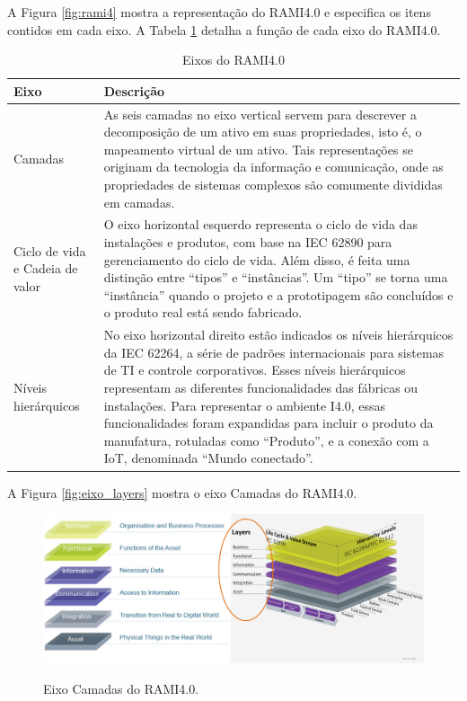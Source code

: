 \documentclass[
	12pt,				%
	oneside,			%
	a4paper,			%
	english,			%
	brazil				%
]{abntex2}
\begin{document}
	A Figura \ref{fig:rami4} mostra a representação do RAMI4.0 e especifica os itens contidos em cada eixo. A Tabela \ref{tab:rami-eixos} detalha a função de cada eixo do RAMI4.0.
	
	\begin{table}[H]
		\centering
		\caption{Eixos do RAMI4.0}
		\begin{tabular}{|p{1.3in}|p{4in}|}
			
			\hline
			\textbf{Eixo}
			&\textbf{Descrição} \\
			
			\hline
			Camadas
			& As seis camadas no eixo vertical servem para descrever a decomposição de um ativo em suas propriedades, isto é, o mapeamento virtual de um ativo. Tais representações se originam da tecnologia da informação e comunicação, onde as propriedades de sistemas complexos são comumente divididas em camadas. \\
			
			
			\hline
			Ciclo de vida e  Cadeia de valor
			& O eixo horizontal esquerdo representa o ciclo de vida das instalações e produtos, com base na IEC 62890 para gerenciamento do ciclo de vida. Além disso, é feita uma distinção entre ``tipos'' e ``instâncias''. Um ``tipo'' se torna uma ``instância'' quando o projeto e a prototipagem são concluídos e o produto real está sendo fabricado. \\
			
			\hline
			Níveis hierárquicos
			& No eixo horizontal direito estão indicados os níveis hierárquicos da IEC 62264, a série de padrões internacionais para sistemas de TI e controle corporativos. Esses níveis hierárquicos representam as diferentes funcionalidades das fábricas ou instalações. Para representar o ambiente I4.0, essas funcionalidades foram expandidas para incluir o produto da manufatura, rotuladas como ``Produto'', e a conexão com a IoT, denominada ``Mundo conectado''. \\
			\hline
			
		\end{tabular}
		\label{tab:rami-eixos}
	\end{table}

	A Figura \ref{fig:eixo_layers} mostra o eixo Camadas do RAMI4.0.
	
	\begin{figure}[H]
		\centering
		\caption{Eixo Camadas do RAMI4.0.}
		\includegraphics[width=1\textwidth]{eixo_camadas.png}
		\label{fig:eixo_camadas}
	\end{figure}
\end{document}
